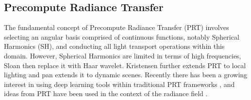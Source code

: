 \subsection{Precompute Radiance Transfer}
The fundamental concept of Precompute Radiance Transfer (PRT) \cite{sloan2002precomputed} involves selecting an angular basis comprised of continuous functions, notably Spherical Harmonics (SH), and conducting all light transport operations within this domain. However, Spherical Harmonics are limited in terms of high frequencies, Sloan \cite{liu2004all} then replace it with Haar wavelet. Kristensen \cite{kristensen2005precomputed} further extends PRT to local lighting and pan \cite{pan2007precomputed} extends it to dynamic scenes. Recently there has been a growing interest in using deep learning tools within traditional PRT frameworks \cite{li2019deep,rainer2022neural}, and ideas from PRT have been used in the context of the radiance field \cite{lagunas2021single}. 
